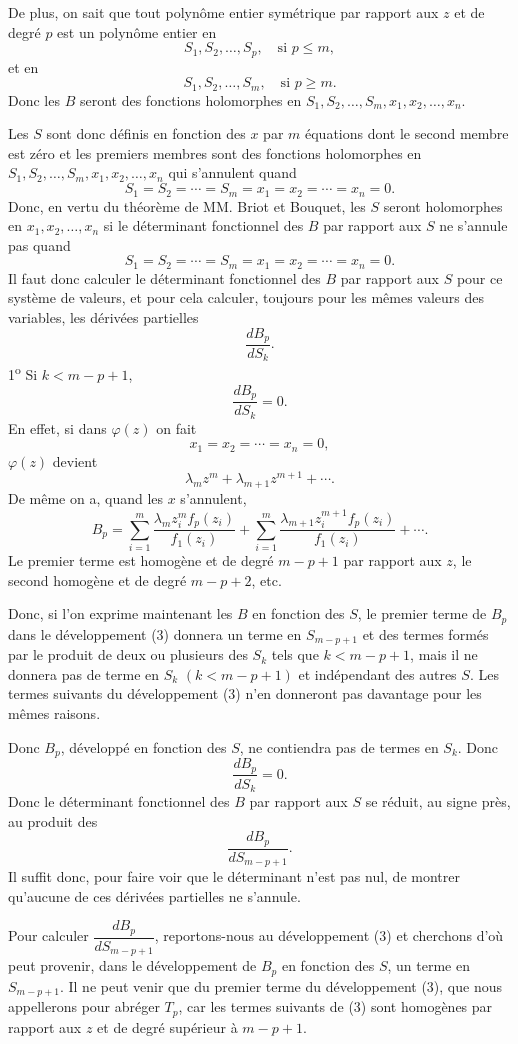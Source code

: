 \documentclass[11pt]{article}
\begin{document}
De plus, on sait que tout polynôme entier symétrique par rapport aux $z$ et de degré $p$ est un polynôme entier en
\[
S_1,S_2,\ldots,S_p,\quad \text{si }p\le m,
\]
et en
\[
S_1,S_2,\ldots,S_m,
\quad \text{si }p\ge m.
\]
Donc les $B$ seront des fonctions holomorphes en $S_1,S_2,\ldots,S_m,x_1,x_2,\ldots,x_n$.

Les $S$ sont donc définis en fonction des $x$ par $m$ équations dont le second membre est zéro et les premiers membres sont des fonctions holomorphes en $S_1,S_2,\ldots,S_m,x_1,x_2,\ldots,x_n$ qui s'annulent quand
\[
S_1=S_2=\cdots=S_m=x_1=x_2=\cdots=x_n=0.
\]
Donc, en vertu du théorème de MM. Briot et Bouquet, les $S$ seront holomorphes en $x_1,x_2,\ldots,x_n$ si le déterminant fonctionnel des $B$ par rapport aux $S$ ne s'annule pas quand
\[
S_1=S_2=\cdots=S_m=x_1=x_2=\cdots=x_n=0.
\]
Il faut donc calculer le déterminant fonctionnel des $B$ par rapport aux $S$ pour ce système de valeurs, et pour cela calculer, toujours pour les mêmes valeurs des variables, les dérivées partielles
\[
\frac{dB_p}{dS_k}.
\]
1\textsuperscript{o} Si $k<m-p+1$,
\[
\frac{dB_p}{dS_k}=0.
\]
En effet, si dans $\varphi(z)$ on fait
\[
x_1=x_2=\cdots=x_n=0,
\]
$\varphi(z)$ devient
\[
\lambda_m z^m+\lambda_{m+1}z^{m+1}+\cdots.
\]
De même on a, quand les $x$ s'annulent,
\begin{equation*}\tag{3}
B_p=\sum_{i=1}^m \frac{\lambda_m z_i^m f_p(z_i)}{f_1(z_i)}+
\sum_{i=1}^m \frac{\lambda_{m+1}z_i^{m+1} f_p(z_i)}{f_1(z_i)}+\cdots .
\end{equation*}
Le premier terme est homogène et de degré $m-p+1$ par rapport aux $z$, le second homogène et de degré $m-p+2$, etc.

Donc, si l'on exprime maintenant les $B$ en fonction des $S$, le premier terme de $B_p$ dans le développement (3) donnera un terme en $S_{m-p+1}$ et des termes formés par le produit de deux ou plusieurs des $S_k$ tels que $k<m-p+1$, mais il ne donnera pas de terme en $S_k$ $(k<m-p+1)$ et indépendant des autres $S$. Les termes suivants du développement (3) n'en donneront pas davantage pour les mêmes raisons.

Donc $B_p$, développé en fonction des $S$, ne contiendra pas de termes en $S_k$. Donc
\[
\frac{dB_p}{dS_k}=0.
\]
Donc le déterminant fonctionnel des $B$ par rapport aux $S$ se réduit, au signe près, au produit des
\[
\frac{dB_p}{dS_{m-p+1}}.
\]
Il suffit donc, pour faire voir que le déterminant n'est pas nul, de montrer qu'aucune de ces dérivées partielles ne s'annule.

Pour calculer $\dfrac{dB_p}{dS_{m-p+1}}$, reportons-nous au développement (3) et cherchons d'où peut provenir, dans le développement de $B_p$ en fonction des $S$, un terme en $S_{m-p+1}$. Il ne peut venir que du premier terme du développement (3), que nous appellerons pour abréger $T_p$, car les termes suivants de (3) sont homogènes par rapport aux $z$ et de degré supérieur à $m-p+1$.
\end{document}
